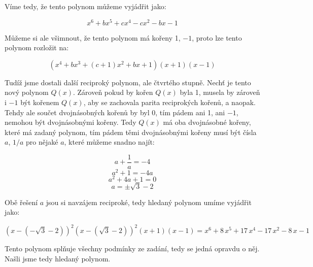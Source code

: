 \documentclass{fkssolpub}
\author{Ondřej Sedláček}
\begin{document}
Víme tedy, že tento polynom můžeme vyjádřit jako:

\[
  x^6 + b x^5 + c x^4 - c x^2 - b x - 1
\]

Můžeme si ale všimnout, že tento polynom má kořeny 1, $-1$, proto lze tento polynom rozložit na:

\[
  {\left(x^{4} + b x^{3} + (c + 1) x^{2} + b x + 1\right)} {\left(x + 1\right)} {\left(x - 1\right)}
\]

Tudíž jsme dostali další reciproký polynom, ale čtvrtého stupně. Nechť je tento nový polynom $Q(x)$. Zároveň pokud by kořen $Q(x)$ byla 1, musela by zároveň i $-1$ být kořenem $Q(x)$, aby se zachovala parita reciprokých kořenů, a naopak. Tehdy ale součet dvojnásobných kořenů by byl 0, tím pádem ani 1, ani $-1$, nemohou být dvojnásobnými kořeny. Tedy $Q(x)$ má oba dvojnásobné kořeny, které má zadaný polynom, tím pádem těmi dvojnásobnými kořeny musí být čísla $a$, $1/a$ pro nějaké $a$, které můžeme snadno najít:

\[
  a + \frac{1}{a} = -4
\]
\[
  a^2 + 1 = -4a
\]
\[
  a^2 + 4a + 1 = 0
\]
\[
  a = \pm \sqrt{3} - 2
\]

Obě řešení $a$ jsou si navzájem reciproké, tedy hledaný polynom umíme vyjádřit jako:

\[
  (x - (- \sqrt{3} - 2))^2 (x - (\sqrt{3} - 2))^2 (x + 1) (x - 1) = x^{6} + 8 \, x^{5} + 17 \, x^{4} - 17 \, x^{2} - 8 \, x - 1
\]

Tento polynom splňuje všechny podmínky ze zadání, tedy se jedná opravdu o něj. Našli jsme tedy hledaný polynom.
\end{document}
